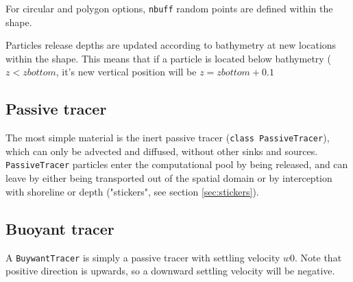 \documentclass[a4paper]{article}
\begin{document}
For circular and polygon options, \texttt{nbuff} random points are defined within the shape.

Particles release depths are updated according to bathymetry at new locations within the shape. This means that if a particle is located below bathymetry ($z < zbottom$, it's new vertical position will be $ z = zbottom+0.1$ 


\subsection{Passive tracer}
\label{ssec:passive}

The most simple material is the inert passive tracer (\texttt{class PassiveTracer}), which can only be advected and diffused, without other sinks and sources. \texttt{PassiveTracer} particles enter the computational pool by being released, and can leave by either being transported out of the spatial domain or by interception with shoreline or depth ("stickers", see section \ref{sec:stickers}).

\subsection{Buoyant tracer}
\label{ssec:buoyant}

A \texttt{BuywantTracer} is simply a passive tracer with settling velocity $w0$. Note that positive direction is upwards, so a downward settling velocity will be negative. 
\end{document}
